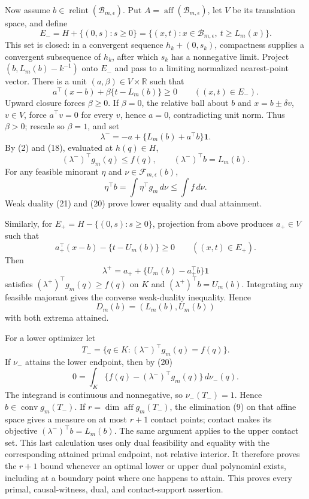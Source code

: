 Now assume \(b\in\operatorname{relint}(\mathcal B_{m,\epsilon})\).  Put \(A=\operatorname{aff}(\mathcal B_{m,\epsilon})\), let \(V\) be its translation space, and define
\[
 E_-=H+\{(0,s):s\geq0\}
 =\{(x,t):x\in\mathcal B_{m,\epsilon},\ t\geq L_m(x)\}.
\tag{17}
\]
This set is closed: in a convergent sequence \(h_k+(0,s_k)\), compactness supplies a convergent subsequence of \(h_k\), after which \(s_k\) has a nonnegative limit.  Project \((b,L_m(b)-k^{-1})\) onto \(E_-\) and pass to a limiting normalized nearest-point vector.  There is a unit \((a,\beta)\in V\times\mathbb R\) such that
\[
 a^{\top}(x-b)+\beta\{t-L_m(b)\}\geq0
 \qquad((x,t)\in E_-).
\tag{18}
\]
Upward closure forces \(\beta\geq0\).  If \(\beta=0\), the relative ball about \(b\) and \(x=b\pm\delta v\), \(v\in V\), force \(a^{\top}v=0\) for every \(v\), hence \(a=0\), contradicting unit norm.  Thus \(\beta>0\); rescale so \(\beta=1\), and set
\[
 \lambda^-=-a+\{L_m(b)+a^{\top}b\}\mathbf1.
\tag{19}
\]
By (2) and (18), evaluated at \(h(q)\in H\),
\[
 (\lambda^-)^{\top}g_m(q)\leq f(q),
 \qquad (\lambda^-)^{\top}b=L_m(b).
\tag{20}
\]
For any feasible minorant \(\eta\) and \(\nu\in\mathcal F_{m,\epsilon}(b)\),
\[
 \eta^{\top}b=\int\eta^{\top}g_m\,d\nu\leq\int f\,d\nu.
\tag{21}
\]
Weak duality (21) and (20) prove lower equality and dual attainment.

Similarly, for \(E_+=H-\{(0,s):s\geq0\}\), projection from above produces \(a_+\in V\) such that
\[
 a_+^{\top}(x-b)-\{t-U_m(b)\}\geq0\qquad((x,t)\in E_+).
\]
Then
\[
 \lambda^+=a_++\{U_m(b)-a_+^{\top}b\}\mathbf1
\tag{22}
\]
satisfies \((\lambda^+)^{\top}g_m(q)\geq f(q)\) on \(K\) and \((\lambda^+)^{\top}b=U_m(b)\).  Integrating any feasible majorant gives the converse weak-duality inequality.  Hence
\[
 D_m(b)=(L_m(b),U_m(b))
\tag{23}
\]
with both extrema attained.

For a lower optimizer let
\[
 T_-=\{q\in K:(\lambda^-)^{\top}g_m(q)=f(q)\}.
\]
If \(\nu_-\) attains the lower endpoint, then by (20)
\[
 0=\int_K\{f(q)-(\lambda^-)^{\top}g_m(q)\}\,d\nu_-(q).
\]
The integrand is continuous and nonnegative, so \(\nu_-(T_-)=1\).  Hence \(b\in\operatorname{conv}g_m(T_-)\).  If \(r=\dim\operatorname{aff}g_m(T_-)\), the elimination (9) on that affine space gives a measure on at most \(r+1\) contact points; contact makes its objective \((\lambda^-)^{\top}b=L_m(b)\).  The same argument applies to the upper contact set.  This last calculation uses only dual feasibility and equality with the corresponding attained primal endpoint, not relative interior.  It therefore proves the \(r+1\) bound whenever an optimal lower or upper dual polynomial exists, including at a boundary point where one happens to attain.  This proves every primal, causal-witness, dual, and contact-support assertion.